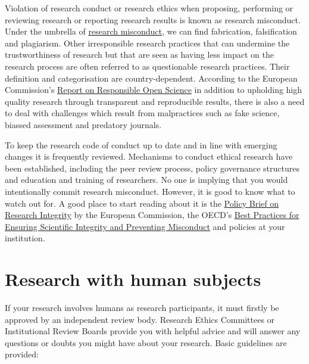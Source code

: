 \documentclass[
]{book}
\begin{document}
Violation of research conduct or research ethics when proposing, performing or reviewing research or reporting research results is known as research misconduct. Under the umbrella of \href{https://en.wikipedia.org/wiki/Scientific_misconduct}{research misconduct}, we can find fabrication, falsification and plagiarism. Other irresponsible research practices that can undermine the trustworthiness of research but that are seen as having less impact on the research process are often referred to as questionable research practices. Their definition and categorisation are country-dependent. According to the European Commission's \href{https://ec.europa.eu/info/sites/default/files/policy_briefing_swafs-30-2020.pdf}{Report on Responsible Open Science} in addition to upholding high quality research through transparent and reproducible results, there is also a need to deal with challenges which result from malpractices such as fake science, biassed assessment and predatory journals.

To keep the research code of conduct up to date and in line with emerging changes it is frequently reviewed. Mechanisms to conduct ethical research have been established, including the peer review process, policy governance structures and education and training of researchers. No one is implying that you would intentionally commit research misconduct. However, it is good to know what to watch out for. A good place to start reading about it is the \href{https://ec.europa.eu/research/participants/documents/downloadPublic?documentIds=080166e5bf5c08aa\&appId=PPGMS}{Policy Brief on Research Integrity} by the European Commission, the OECD's \href{https://www.oecd.org/science/inno/40188303.pdf}{Best Practices for Ensuring Scientific Integrity and Preventing Misconduct} and policies at your institution.

\hypertarget{research-with-human-subjects}{%
\section{Research with human subjects}\label{research-with-human-subjects}}

If your research involves humans as research participants, it must firstly be approved by an independent review body. Research Ethics Committees or Institutional Review Boards provide you with helpful advice and will answer any questions or doubts you might have about your research. Basic guidelines are provided:
\end{document}
